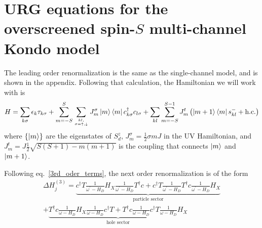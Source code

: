 \documentclass[12pt]{revtex4-2}
\begin{document}
\section{URG equations for the overscreened spin-\(S\) multi-channel Kondo model}
The leading order renormalization is the same as the single-channel model, and is shown in the appendix. Following that calculation, the Hamiltonian we will work with is 
\begin{equation}\begin{aligned}
	\label{H_spin_S}
    H = \sum_{k\sigma}\epsilon_{k}\tau_{k\sigma} + \sum_{m=-S}^S \sum_{kl,\atop{\sigma=\uparrow,\downarrow}} J^\sigma_m \ket{m}\bra{m} c^\dagger_{k \sigma}c_{l \sigma} + \sum_{kl} \sum_{m=-S}^{S-1} J^t_{m} \left(\ket{m+1}\bra{m} s^-_{kl}  + \text{h.c.}\right)
\end{aligned}\end{equation}
where \(\left\{\ket{m}\right\} \) are the eigenstates of \(S_d^z\), \(J^\sigma_m = \frac{1}{2} \sigma m J\) in the UV Hamiltonian, and \(J^t_{m} = J\frac{1}{2}\sqrt{S(S+1) - m(m+1)}\) is the coupling that connects \(\ket{m}\) and \(\ket{m+1}\). 

Following eq.~\ref{3rd_oder_terms}, the next order renormalization is of the form
\begin{equation}\begin{aligned}
	\Delta H^{(3)}_j = \underbrace{c^\dagger T \frac{1}{\omega^\prime - H_D} H_X \frac{1}{\omega^\prime - H_D} T^\dagger c + c^\dagger T \frac{1}{\omega^\prime - H_D} T^\dagger c \frac{1}{\omega^\prime - H_D} H_X}_\text{particle sector}\nonumber\\
	+ \underbrace{T^\dagger c \frac{1}{\omega - H_D} H_X \frac{1}{\omega - H_D} c^\dagger T + T^\dagger c \frac{1}{\omega - H_D} c^\dagger T \frac{1}{\omega - H_D} H_X}_\text{hole sector}
\end{aligned}\end{equation}
\end{document}

